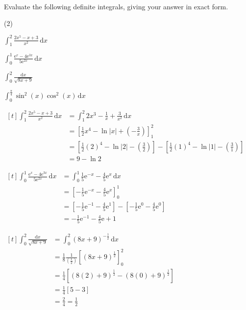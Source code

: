 \documentclass[11pt,a4paper]{book}
\begin{document}
\begin{example}

Evaluate the following definite integrals, giving your answer in exact
form.

\begin{tasks}[label=(\alph*),label-width=3.5ex](2)

\task ${\displaystyle \int_{1}^{2}\frac{2x^{5}-x+3}{x^{2}}\,\mathrm{d}x}$

\task ${\displaystyle \int_{0}^{1}\frac{\mathrm{e}^{x}-4\mathrm{e}^{3x}}{5\mathrm{e}^{2x}}\,\mathrm{d}x}$

\task ${\displaystyle \int_{0}^{2}\frac{\mathrm{d}x}{\sqrt{8x+9}}}$

\task ${\displaystyle \int_{0}^{\frac{\pi}{4}}\sin^{2}(x)\cos^{2}(x)}\,\mathrm{d}x$

\end{tasks}

\Solution

\begin{tasks}[label=(\alph*),label-width=3.5ex]

\task
$
\begin{aligned}[t]
{\displaystyle \int_{1}^{2}\frac{2x^{5}-x+3}{x^{2}}\,\mathrm{d}x} & =\int_{1}^{2}2x^{3}-\frac{1}{x}+\frac{3}{x^{2}}\,\mathrm{d}x\\
 & =\left[\frac{1}{2}x^{4}-\ln\left|x\right|+\left(-\frac{3}{x}\right)\right]_{1}^{2}\\
 & =\left[\frac{1}{2}(2)^{4}-\ln\left|2\right|-\left(\frac{3}{2}\right)\right]-\left[\frac{1}{2}(1)^{4}-\ln\left|1\right|-\left(\frac{3}{1}\right)\right]\\
 & =9-\ln2
\end{aligned}
$

\task
$
\begin{aligned}[t]
{\displaystyle \int_{0}^{1}\frac{\mathrm{e}^{x}-4\mathrm{e}^{3x}}{5\mathrm{e}^{2x}}\,\mathrm{d}x} & =\int_{0}^{1}\frac{1}{5}\mathrm{e}^{-x}-\frac{4}{5}\mathrm{e}^{x}\,\mathrm{d}x\\
 & =\left[-\frac{1}{5}\mathrm{e}^{-x}-\frac{4}{5}\mathrm{e}^{x}\right]_{0}^{1}\\
 & =\left[-\frac{1}{5}\mathrm{e}^{-1}-\frac{4}{5}\mathrm{e}^{1}\right]-\left[-\frac{1}{5}\mathrm{e}^{0}-\frac{4}{5}\mathrm{e}^{0}\right]\\
 & =-\frac{1}{5}\mathrm{e}^{-1}-\frac{4}{5}\mathrm{e}+1
\end{aligned}
$

\task$
\begin{aligned}[t]
\int_{0}^{2}\frac{\mathrm{d}x}{\sqrt{8x+9}} & =\int_{0}^{2}(8x+9)^{-\frac{1}{2}}\,\mathrm{d}x\\
 & =\frac{1}{8}\frac{1}{\left(\frac{1}{2}\right)}\left[\left(8x+9\right)^{\frac{1}{2}}\right]_{0}^{2}\\
 & =\frac{1}{4}\left[\left(8(2)+9\right)^{\frac{1}{2}}-\left(8(0)+9\right)^{\frac{1}{2}}\right]\\
 & =\frac{1}{4}[5-3]\\
 & =\frac{2}{4}=\frac{1}{2}
\end{aligned}
$


\end{tasks}
\end{example}
\end{document}
